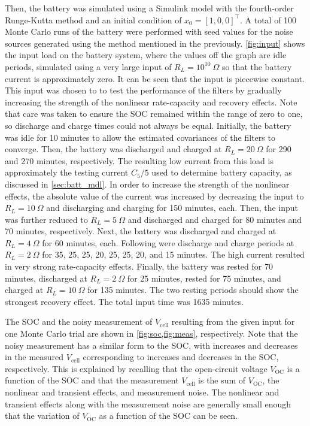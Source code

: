 \documentclass[../zhang_thesis.tex]{subfiles}
\begin{document}
Then, the battery was simulated using a Simulink model with the fourth-order Runge-Kutta method and an initial condition of $x_0=[1,0,0]^\top$. A total of 100 Monte Carlo runs of the battery were performed with seed values for the noise sources generated using the method mentioned in the previously. \cref{fig:input} shows the input load on the battery system, where the values off the graph are idle periods, simulated using a very large input of $R_L=10^{10}~\Omega$ so that the battery current
is approximately zero. It can be seen that the input is piecewise constant. This input was chosen to to test the performance of the filters by gradually increasing the strength of the nonlinear rate-capacity and recovery effects. Note that care was taken to ensure the SOC remained within the range of zero to one, so discharge and charge times could not always be equal. Initially, the battery was idle for 10 minutes to allow the estimated covariances of the filters to converge. Then, the
battery was discharged and charged at $R_L=20~\Omega$ for 290 and 270 minutes, respectively. The resulting low current from this load is approximately the testing current $C_5/5$ used to determine battery capacity, as discussed in \cref{sec:batt_mdl}. In order to increase the strength of the nonlinear effects, the absolute value of the current was increased by decreasing the input to $R_L=10~\Omega$ and discharging and charging for 150 minutes, each. Then, the input was further
reduced to $R_L=5~\Omega$ and discharged and charged for 80 minutes and 70 minutes, respectively. Next, the battery was discharged and charged at $R_L=4~\Omega$ for 60 minutes, each. Following were discharge and charge periods at $R_L=2~\Omega$ for 35, 25, 25, 20, 25, 25, 20, and 15 minutes. The high current resulted in very strong rate-capacity effects. Finally, the battery was rested for 70 minutes, discharged at $R_L=2~\Omega$ for 25 minutes, rested for 75 minutes, and charged at
$R_L=10~\Omega$ for 135 minutes. The two resting periods should show the strongest recovery effect. The total input time was 1635 minutes.

The SOC and the noisy measurement of $V_\text{cell}$ resulting from the given input for one Monte Carlo trial are shown in \cref{fig:soc,fig:meas}, respectively. Note that the noisy measurement has a similar form to the SOC, with increases and decreases in the measured $V_\text{cell}$ corresponding to increases and decreases in the SOC,
respectively. This is explained by recalling that the open-circuit voltage $V_\text{OC}$ is a function of the SOC and that the measurement $V_\text{cell}$ is the sum of $V_\text{OC}$, the nonlinear and transient effects, and measurement noise. The nonlinear and transient effects along with the measurement noise are generally small enough that the variation of $V_\text{OC}$ as a function of the SOC can be seen.
\end{document}
